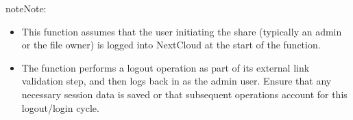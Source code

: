 \documentclass[letterpaper,10pt,english]{sphinxmanual}
\begin{document}
\begin{fulllineitems}
\begin{sphinxVerbatim}[commandchars=\\\{\}]
   
  
  
  
  
     
 
    
    
\end{sphinxVerbatim}

\begin{sphinxadmonition}{note}{Note:}\begin{itemize}
\item {} 
\sphinxAtStartPar
This function assumes that the user initiating the share (typically an admin or the file owner) is
logged into NextCloud at the start of the function.

\item {} 
\sphinxAtStartPar
The function performs a logout operation as part of its external link validation step, and then logs
back in as the admin user. Ensure that any necessary session data is saved or that subsequent operations
account for this logout/login cycle.

\end{itemize}
\end{sphinxadmonition}

\end{fulllineitems}
\end{document}
